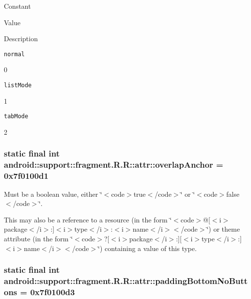 Constant

Value

Description 

{\tt normal}

0

{\tt listMode}

1

{\tt tabMode}

2\hypertarget{classandroid_1_1support_1_1fragment_1_1_r_1_1attr_953661a816f140dc5c0139d6d6929484}{
\subsubsection[{overlapAnchor}]{\setlength{\rightskip}{0pt plus 5cm}static final int android::support::fragment.R.R::attr::overlapAnchor = 0x7f0100d1}}
\label{classandroid_1_1support_1_1fragment_1_1_r_1_1attr_953661a816f140dc5c0139d6d6929484}


Must be a boolean value, either \char`\"{}$<$code$>$true$<$/code$>$\char`\"{} or \char`\"{}$<$code$>$false$<$/code$>$\char`\"{}. 

This may also be a reference to a resource (in the form \char`\"{}$<$code$>$@\mbox{[}$<$i$>$package$<$/i$>$:\mbox{]}$<$i$>$type$<$/i$>$:$<$i$>$name$<$/i$>$$<$/code$>$\char`\"{}) or theme attribute (in the form \char`\"{}$<$code$>$?\mbox{[}$<$i$>$package$<$/i$>$:\mbox{]}\mbox{[}$<$i$>$type$<$/i$>$:\mbox{]}$<$i$>$name$<$/i$>$$<$/code$>$\char`\"{}) containing a value of this type. \hypertarget{classandroid_1_1support_1_1fragment_1_1_r_1_1attr_7282ebbb642f273cbd7fa736919d6a1c}{
\subsubsection[{paddingBottomNoButtons}]{\setlength{\rightskip}{0pt plus 5cm}static final int android::support::fragment.R.R::attr::paddingBottomNoButtons = 0x7f0100d3}}
\label{classandroid_1_1support_1_1fragment_1_1_r_1_1attr_7282ebbb642f273cbd7fa736919d6a1c}


